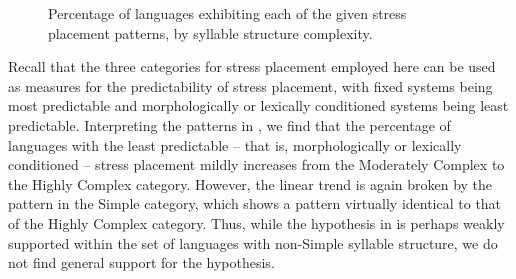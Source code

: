 \begin{figure}
\caption{\label{fig:5.1}Percentage of languages exhibiting each of the given stress placement patterns, by syllable structure complexity.}
\end{figure}

  Recall that the three categories for stress placement employed here can be used as measures for the predictability of stress placement, with fixed systems being most predictable and morphologically or lexically conditioned systems being least predictable. Interpreting the patterns in , we find that the percentage of languages with the least predictable -- that is, morphologically or lexically conditioned -- stress placement mildly increases from the Moderately Complex to the Highly Complex category. However, the linear trend is again broken by the pattern in the Simple category, which shows a pattern virtually identical to that of the Highly Complex category. Thus, while the hypothesis in  is perhaps weakly supported within the set of languages with non-Simple syllable structure, we do not find general support for the hypothesis.

